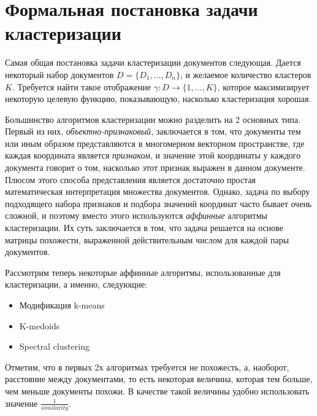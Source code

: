 \section{Формальная постановка задачи кластеризации}

Самая общая постановка задачи кластеризации документов следующая. Дается некоторый набор документов $D = \{D_1, \dots, D_n\}$, и желаемое количество кластеров $K$. Требуется найти такое отображение $\gamma: D \rightarrow \{1, \dots, K\}$, которое максимизирует некоторую целевую функцию, показывающую, насколько кластеризация хорошая.

Большинство алгоритмов кластеризации можно разделить на 2 основных типа. Первый из них, \emph{объектно-признаковый}, заключается в том, что документы тем или иным образом представляются в многомерном векторном пространстве, где каждая координата является \emph{признаком}, и значение этой координаты у каждого документа говорит о том, насколько этот признак выражен в данном документе. Плюсом этого способа представления является достаточно простая математическая интерпретация множества документов. Однако, задача по выбору подходящего набора признаков и подбора значений координат часто бывает очень сложной, и поэтому вместо этого используются \emph{аффинные} алгоритмы кластеризации. Их суть заключается в том, что задача решается на основе матрицы похожести, выраженной действительным числом для каждой пары документов.

Рассмотрим теперь некоторые аффинные алгоритмы, использованные для кластеризации, а именно, следующие:
\begin{itemize}
\item Модификация k-means
\item K-medoids
\item Spectral clustering
\end{itemize}
Отметим, что в первых 2х алгоритмах требуется не похожесть, а, наоборот, расстояние между документами, то есть некоторая величина, которая тем больше, чем меньше документы похожи. В качестве такой величины удобно использовать значение $\frac{1}{similarity}$.